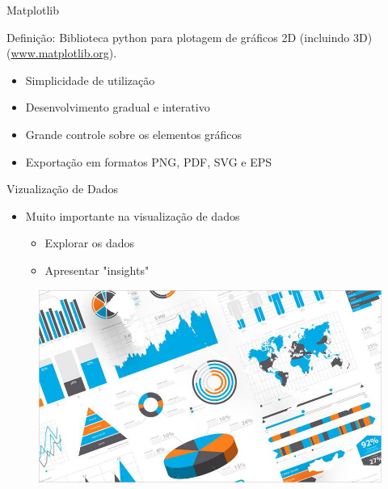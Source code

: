 \begin{frame}[t, fragile]{Matplotlib}
  \begin{block}{Definição:}
    Biblioteca python para plotagem de gráficos 2D (incluindo 3D)   (\url{www.matplotlib.org}). 
  \end{block}
  \begin{itemize}
    \item Simplicidade de utilização
    \item Desenvolvimento gradual e interativo
    \item Grande controle sobre os elementos gráficos
    \item Exportação em formatos PNG, PDF, SVG e EPS 
  \end{itemize}
\end{frame}
%
\begin{frame}[t, fragile]{Vizualização de Dados}
  \begin{itemize}
    \item Muito importante na visualização de dados
    \begin{itemize}
      \item Explorar os dados
      \item Apresentar "insights"
    \end{itemize}
  \end{itemize}
  \begin{figure}
    \includegraphics[scale=.30]{aula-2/figuras/matplot-dataviz-a.jpg}
  \end{figure}
\end{frame}
%

 